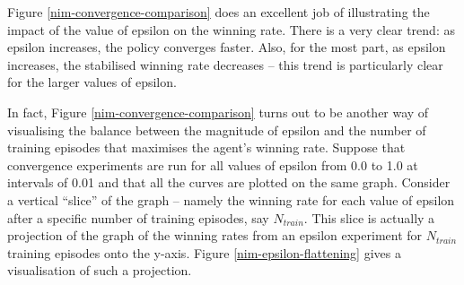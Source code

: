 \documentclass[11pt,a4paper]{report}
\begin{document}
Figure \ref{nim-convergence-comparison} does an excellent job of illustrating the impact of the value of epsilon on the winning rate. There is a very clear trend: as epsilon increases, the policy converges faster. Also, for the most part, as epsilon increases, the stabilised winning rate decreases -- this trend is particularly clear for the larger values of epsilon.

In fact, Figure \ref{nim-convergence-comparison} turns out to be another way of visualising the balance between the magnitude of epsilon and the number of training episodes that maximises the agent's winning rate. Suppose that convergence experiments are run for all values of epsilon from 0.0 to 1.0 at intervals of 0.01 and that all the curves are plotted on the same graph. Consider a vertical ``slice'' of the graph -- namely the winning rate for each value of epsilon after a specific number of training episodes, say $N_{train}$. This slice is actually a projection of the graph of the winning rates from an epsilon experiment for $N_{train}$ training episodes onto the y-axis. Figure \ref{nim-epsilon-flattening} gives a visualisation of such a projection.
\end{document}

